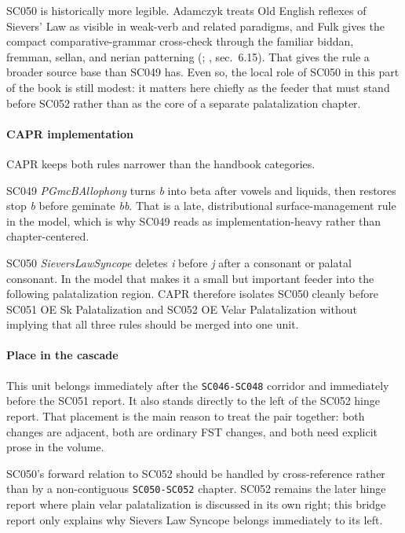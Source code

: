 \documentclass[
  british,
  a4paper,
]{article}
\begin{document}
SC050 is historically more legible. Adamczyk treats Old English reflexes
of Sievers' Law as visible in weak-verb and related paradigms, and Fulk
gives the compact comparative-grammar cross-check through the familiar
biddan, fremman, sellan, and nerian patterning
(;
, sec.~6.15). That gives the rule
a broader source base than SC049 has. Even so, the local role of SC050
in this part of the book is still modest: it matters here chiefly as the
feeder that must stand before SC052 rather than as the core of a
separate palatalization chapter.

\paragraph{CAPR implementation}\label{capr-implementation-30}

CAPR keeps both rules narrower than the handbook categories.

SC049 \emph{PGmcBAllophony} turns \emph{b} into beta after vowels and
liquids, then restores stop \emph{b} before geminate \emph{bb}. That is
a late, distributional surface-management rule in the model, which is
why SC049 reads as implementation-heavy rather than chapter-centered.

SC050 \emph{SieversLawSyncope} deletes \emph{i} before \emph{j} after a
consonant or palatal consonant. In the model that makes it a small but
important feeder into the following palatalization region. CAPR
therefore isolates SC050 cleanly before SC051 OE Sk Palatalization and
SC052 OE Velar Palatalization without implying that all three rules
should be merged into one unit.

\paragraph{Place in the cascade}\label{place-in-the-cascade-30}

This unit belongs immediately after the \texttt{SC046-SC048} corridor
and immediately before the SC051 report. It also stands directly to the
left of the SC052 hinge report. That placement is the main reason to
treat the pair together: both changes are adjacent, both are ordinary
FST changes, and both need explicit prose in the volume.

SC050's forward relation to SC052 should be handled by cross-reference
rather than by a non-contiguous \texttt{SC050-SC052} chapter. SC052
remains the later hinge report where plain velar palatalization is
discussed in its own right; this bridge report only explains why Sievers
Law Syncope belongs immediately to its left.
\end{document}
